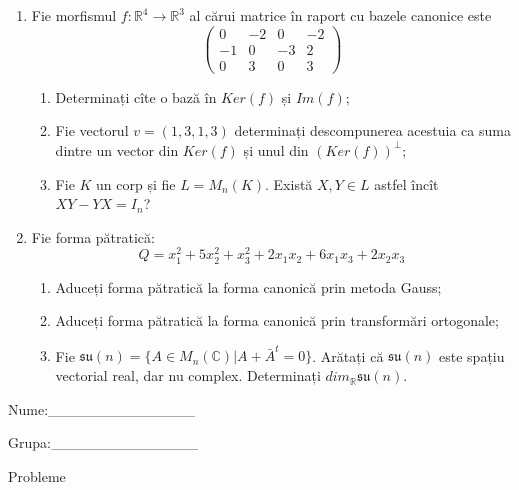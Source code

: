 \documentclass{article}
\begin{document}
\begin{enumerate}
 \item Fie morfismul $f:\mathbb{R}^4 \to \mathbb{R}^3$ al cărui matrice în raport cu bazele canonice este
$$\begin{pmatrix}
0&-2&0&-2\\
-1&0&-3&2\\
0&3&0&3
\end{pmatrix}$$

\begin{enumerate}
\item Determinați cîte o bază în $Ker(f)$ și $Im(f)$;
\item Fie vectorul $v=(1,3,1,3)$ determinați descompunerea acestuia ca suma dintre un vector din $Ker(f)$ și unul din $(Ker(f))^\perp$;
\item Fie $K$ un corp și fie $L=M_n(K)$. Există $X,Y \in L$ astfel încît $XY-YX=I_n$?  
\end{enumerate}
\item Fie forma pătratică:
$$Q= x_1^2+5x_2^2+x_3^2+2x_1x_2+6x_1x_3+2x_2x_3$$

\begin{enumerate}
\item Aduceți forma pătratică la forma canonică prin metoda Gauss;
\item Aduceți forma pătratică la forma canonică prin transformări ortogonale;
\item Fie $\mathfrak{su}(n)=\{ A \in M_n(\mathbb{C}) | A+\bar{A}^t=0\}$. Arătați că $\mathfrak{su}(n)$ este spațiu vectorial real, dar nu complex.
Determinați $dim_{\mathbb{R}}\mathfrak{su}(n)$.
\end{enumerate}
\end{enumerate}
\newpage
\begin{flushright}
Nume:\_\_\_\_\_\_\_\_\_\_\_\_\_\_
 
 
Grupa:\_\_\_\_\_\_\_\_\_\_\_\_\_\_
\end{flushright}
\begin{center}
\vspace{2cm}
{\Large Probleme}
\vspace{2cm}
\end{center}
\end{document}
